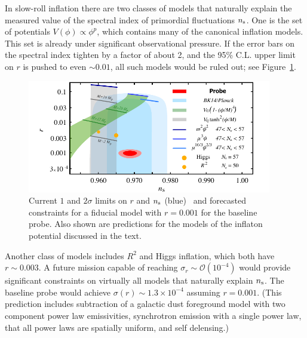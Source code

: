 In slow-roll inflation there are two classes of models that naturally explain the measured value of the spectral index 
of primordial fluctuations $n_{\rm s}$. 
One is the set of potentials $V(\phi)\propto\phi^p$, which contains many of the canonical inflation models. This 
set is already under significant observational pressure. If the error bars on the spectral index tighten by a factor of about 2, 
and the 95\% C.L. upper limit on $r$ is pushed to even $\sim0.01$, all such models would be 
ruled out; see Figure~\ref{fig:nsrp001}. 
\begin{figure}[ht!]
\hspace{-0.1in}
\parbox{4.in}{\centerline {
\includegraphics[width=4.2in]{figs/nsrlabeledrp001v2} } }
\hspace{-0.05in}
\parbox{2.5in}{
\caption{ \small \setlength{\baselineskip}{0.90\baselineskip}
Current $1$ and $2\sigma $ limits on $r$ and $n_{\rm s}$ (blue)~\cite{Array:2015xqh} and forecasted constraints for a fiducial 
model with $r=0.001$ for the baseline probe. 
Also shown are predictions for the models of the inflaton potential discussed in the text.
\label{fig:nsrp001} } }
\end{figure}

Another class of models includes $R^{2}$ and Higgs inflation, which both have $r\sim0.003$. A future mission 
capable of reaching $\sigma_r\sim\mathcal{O}(10^{-4})$ would provide significant constraints on virtually all models that naturally explain $n_{\rm s}$. 
The baseline probe would achieve $\sigma(r)\sim1.3 \times 10^{-4}$ assuming $r=0.001$. (This
prediction includes subtraction of a galactic dust foreground model with two component power law emissivities, 
synchrotron emission with a single power law, that all power laws are spatially uniform, and self delensing.) 

